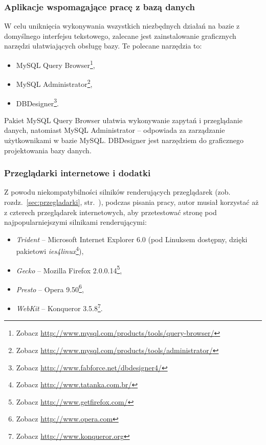 \documentclass[a4paper,12pt,oneside]{report}
\begin{document}
\subsubsection{Aplikacje wspomagające pracę z bazą danych}
\label{subsub:querybrowser}
W celu uniknięcia wykonywania wszystkich niezbędnych działań na bazie z domyślnego interfejsu tekstowego, zalecane jest zainstalowanie graficznych narzędzi ułatwiających obsługę bazy. Te polecane narzędzia to:
\begin{itemize}
  \item MySQL Query Browser\footnote{Zobacz \url{http://www.mysql.com/products/tools/query-browser/}},
  \item MySQL Administrator\footnote{Zobacz \url{http://www.mysql.com/products/tools/administrator/}},
  \item DBDesigner\footnote{Zobacz \url{http://www.fabforce.net/dbdesigner4/}}.
\end{itemize}
Pakiet MySQL Query Browser ułatwia wykonywanie zapytań i przeglądanie danych, natomiast MySQL Administrator -- odpowiada za zarządzanie użytkownikami w bazie MySQL. DBDesigner jest narzędziem do graficznego projektowania bazy danych.

\subsubsection{Przeglądarki internetowe i dodatki}
\label{subsub:browser}
Z powodu niekompatybilności silników renderujących przeglądarek (zob. rozdz.~\ref{sec:przegladarki}, str.~\pageref{sec:przegladarki}), podczas pisania pracy, autor musiał korzystać aż z czterech przeglądarek internetowych, aby przetestować stronę pod najpopularniejszymi silnikami renderującymi:
\begin{itemize}
  \item \emph{Trident} -- Microsoft Internet Explorer 6.0 (pod Linuksem dostępny, dzięki pakietowi \emph{ies4linux}\footnote{Zobacz \url{http://www.tatanka.com.br/}}),
  \item \emph{Gecko} -- Mozilla Firefox 2.0.0.14\footnote{Zobacz \url{http://www.getfirefox.com/}},
  \item \emph{Presto} -- Opera 9.50\footnote{Zobacz \url{http://www.opera.com}},
  \item \emph{WebKit} -- Konqueror 3.5.8\footnote{Zobacz \url{http://www.konqueror.org}}.
\end{itemize}
\end{document}

